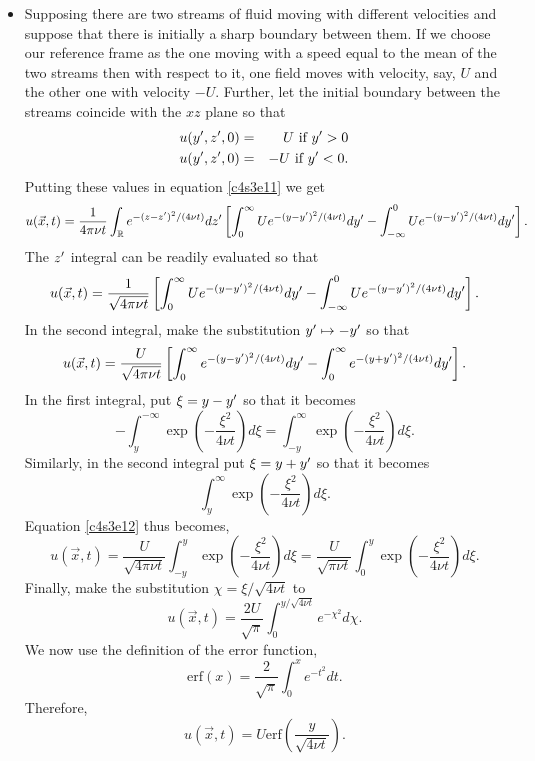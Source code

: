 \begin{itemize}
\item Supposing there are two streams of fluid moving with different velocities and suppose that there is
initially a sharp boundary between them. If we choose our reference frame as the one moving with a speed
equal to the mean of the two streams then with respect to it, one field moves with velocity, say, $U$ and 
the other one with velocity $-U$. Further, let the initial boundary between the streams coincide with
the $xz$ plane so that
\begin{eqnarray*}
u(y^\prime, z^\prime, 0) &=& U \text{ if } y^\prime > 0 \\
u(y^\prime, z^\prime, 0) &=& -U \text{ if } y^\prime < 0.
\end{eqnarray*}
Putting these values in equation \eqref{c4s3e11} we get
\[
u(\vec{x},t) = \frac{1}{4\pi\nu t}\int_{\mathbb{R}}e^{-(z-z^\prime)^2/(4\nu t)}dz^\prime\left[\int_0^\infty U e^{-(y-y^\prime)^2/(4\nu t)}dy^\prime - \int_{-\infty}^0 U e^{-(y-y^\prime)^2/(4\nu t)}dy^\prime\right].
\]
The $z^\prime$ integral can be readily evaluated so that
\[
u(\vec{x},t) = \frac{1}{\sqrt{4\pi\nu t}}\left[\int_0^\infty U e^{-(y-y^\prime)^2/(4\nu t)}dy^\prime - \int_{-\infty}^0 U e^{-(y-y^\prime)^2/(4\nu t)}dy^\prime\right].
\]
In the second integral, make the substitution $y^\prime \mapsto -y^\prime$ so that
\begin{equation}\label{c4s3e12}
u(\vec{x},t) = \frac{U}{\sqrt{4\pi\nu t}}\left[\int_0^\infty e^{-(y-y^\prime)^2/(4\nu t)}dy^\prime - \int_0^\infty e^{-(y+y^\prime)^2/(4\nu t)}dy^\prime\right].
\end{equation}
In the first integral, put $\xi = y - y^\prime$ so that it becomes
\[
-\int_y^{-\infty}\exp\left(-\frac{\xi^2}{4\nu t}\right)d\xi = \int_{-y}^\infty\exp\left(-\frac{\xi^2}{4\nu t}\right)d\xi.
\]
Similarly, in the second integral put $\xi = y + y^\prime$ so that it becomes
\[
\int_y^\infty\exp\left(-\frac{\xi^2}{4\nu t}\right)d\xi.
\]
Equation \eqref{c4s3e12} thus becomes,
\[
u(\vec{x}, t) = \frac{U}{\sqrt{4\pi\nu t}}\int_{-y}^y\exp\left(-\frac{\xi^2}{4\nu t}\right)d\xi = \frac{U}{\sqrt{\pi\nu t}}\int_0^y\exp\left(-\frac{\xi^2}{4\nu t}\right)d\xi.
\]
Finally, make the substitution $\chi = \xi/\sqrt{4\nu t}$ to
\[
u(\vec{x}, t) = \frac{2U}{\sqrt{\pi}}\int_0^{y/\sqrt{4\nu t}} e^{-\chi^2}d\chi.
\]
We now use the definition of the error function,
\begin{equation}\label{c4s3e13}
\text{erf}(x) = \frac{2}{\sqrt{\pi}}\int_0^x e^{-t^2}dt.
\end{equation}
Therefore, 
\begin{equation}\label{c4s3e14}
u(\vec{x}, t) = U\text{erf}\left(\frac{y}{\sqrt{4\nu t}}\right).

\end{equation}
\end{itemize}
